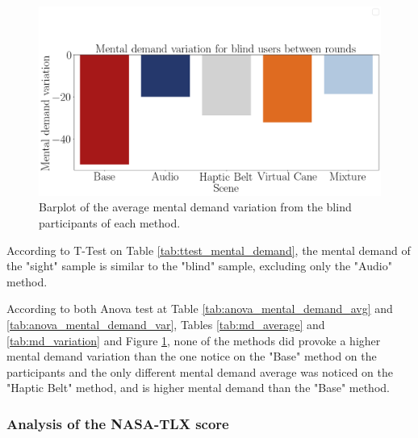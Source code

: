



\begin{figure}[!htb]
    \centering
    \includegraphics[width = 0.8\linewidth]{Resultados/Nasa/Figuras/png/barplot_md_var_scene_blind.png}
    \caption{Barplot of the average mental demand variation from the blind participants of each method.}
    \label{fig:barplot_md_var_scene_blind}
\end{figure}

According to T-Test on Table \ref{tab:ttest_mental_demand}, the mental demand of the "sight" sample is similar to the "blind" sample, excluding only the "Audio" method.

According to both Anova test at Table \ref{tab:anova_mental_demand_avg} and \ref{tab:anova_mental_demand_var}, Tables \ref{tab:md_average} and \ref{tab:md_variation} and Figure \ref{fig:barplot_md_var_scene_blind}, none of the methods did provoke a higher mental demand variation than the one notice on the "Base" method on the participants and the only different mental demand average was noticed on the "Haptic Belt" method, and is higher mental demand than the "Base" method.

\FloatBarrier



\subsubsection{Analysis of the NASA-TLX score}

